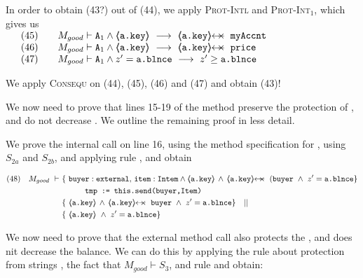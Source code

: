 \begin{proofO}
In order to obtain (43?) out of (44), we apply \textsc{Prot-Intl} and \textsc{Prot-Int}$_1$,   which gives us\\
$
\begin{array}{llll}
& (45) & & M_{good} \vdash \Alocalsb \wedge  {\inside{\prg{a.key}}}\  \longrightarrow\ \protectedFrom {\prg{a.key}} {\prg{myAccnt}} 
\\
& (46) & & M_{good} \vdash \Alocalsb \wedge  {\inside{\prg{a.key}}}\  \longrightarrow\ \protectedFrom {\prg{a.key}} {\prg{price}} 
\\
& (47) & & M_{good} \vdash \Alocalsb \wedge  z'= \prg{a.\balance}\   \longrightarrow\  z'\geq \prg{a.\balance} 
\end{array}
$

We apply {\textsc{Consequ}} on (44), (45), (46) and (47) and obtain (43)!

\normalsize


 We now need to prove that lines 15-19 of the method preserve the protection of , and do not decrease .
 We outline the  remaining proof in less detail.
 
 We prove the internal call on line 16, using the method specification for , using $S_{2a}$ and $S_{2b}$, and applying rule {}, and obtain

 \small
\begin{align*}
\text{(48)} \ \ \ M_{good}\  \vdash \ & \{ \ \prg{buyer}:\prg{external},\, \prg{item}:\prg{Intem} \wedge {\inside{\prg{a.key}}} \, \wedge\, 
\protectedFrom {\prg{a.key}} {(\prg{buyer}}  \  \wedge\ z'= \prg{a.\balance}  \} \\
		  		& \SPT  \prg{tmp := this.send(buyer,Item)}\ \\  
		  		& \{ \ \inside{\prg{a.key}} \, \wedge\, 
\protectedFrom {\prg{a.key}} {\prg{buyer}} \ \wedge\ z'= \prg{a.\balance}  \} \ \ \  || \ \ \  \\
		  		&   \{ \   {\inside{\prg{a.key}}}\  \wedge\ z'= \prg{a.\balance}  \}
\end{align*}
\normalsize  
 

We now need to prove that the external method call  also protects the , and does nit decrease the balance. We can do this by applying the rule about protection from strings  {}, the fact that $M_{good} \vdash S_{3}$, and rule  {} and obtain:



\end{proofO}
